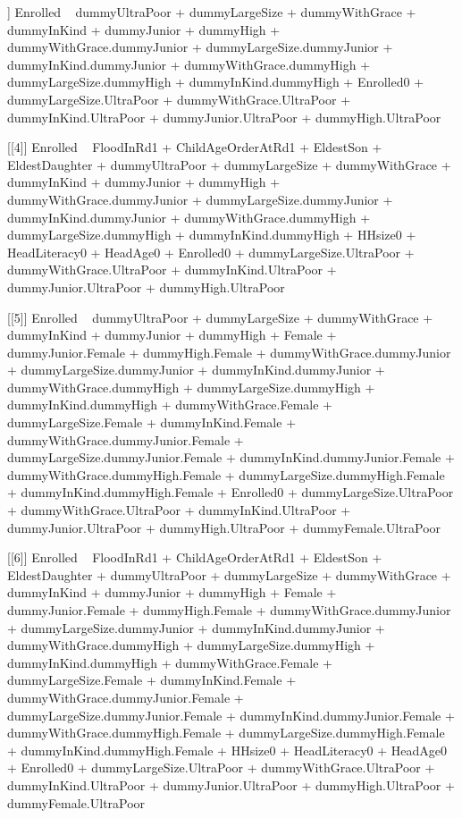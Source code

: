 \begin{Schunk}
\begin{Soutput}
[[3]]
Enrolled ~ dummyUltraPoor + dummyLargeSize + dummyWithGrace + 
    dummyInKind + dummyJunior + dummyHigh + dummyWithGrace.dummyJunior + 
    dummyLargeSize.dummyJunior + dummyInKind.dummyJunior + dummyWithGrace.dummyHigh + 
    dummyLargeSize.dummyHigh + dummyInKind.dummyHigh + Enrolled0 + 
    dummyLargeSize.UltraPoor + dummyWithGrace.UltraPoor + dummyInKind.UltraPoor + 
    dummyJunior.UltraPoor + dummyHigh.UltraPoor

[[4]]
Enrolled ~ FloodInRd1 + ChildAgeOrderAtRd1 + EldestSon + EldestDaughter + 
    dummyUltraPoor + dummyLargeSize + dummyWithGrace + dummyInKind + 
    dummyJunior + dummyHigh + dummyWithGrace.dummyJunior + dummyLargeSize.dummyJunior + 
    dummyInKind.dummyJunior + dummyWithGrace.dummyHigh + dummyLargeSize.dummyHigh + 
    dummyInKind.dummyHigh + HHsize0 + HeadLiteracy0 + HeadAge0 + 
    Enrolled0 + dummyLargeSize.UltraPoor + dummyWithGrace.UltraPoor + 
    dummyInKind.UltraPoor + dummyJunior.UltraPoor + dummyHigh.UltraPoor

[[5]]
Enrolled ~ dummyUltraPoor + dummyLargeSize + dummyWithGrace + 
    dummyInKind + dummyJunior + dummyHigh + Female + dummyJunior.Female + 
    dummyHigh.Female + dummyWithGrace.dummyJunior + dummyLargeSize.dummyJunior + 
    dummyInKind.dummyJunior + dummyWithGrace.dummyHigh + dummyLargeSize.dummyHigh + 
    dummyInKind.dummyHigh + dummyWithGrace.Female + dummyLargeSize.Female + 
    dummyInKind.Female + dummyWithGrace.dummyJunior.Female + 
    dummyLargeSize.dummyJunior.Female + dummyInKind.dummyJunior.Female + 
    dummyWithGrace.dummyHigh.Female + dummyLargeSize.dummyHigh.Female + 
    dummyInKind.dummyHigh.Female + Enrolled0 + dummyLargeSize.UltraPoor + 
    dummyWithGrace.UltraPoor + dummyInKind.UltraPoor + dummyJunior.UltraPoor + 
    dummyHigh.UltraPoor + dummyFemale.UltraPoor

[[6]]
Enrolled ~ FloodInRd1 + ChildAgeOrderAtRd1 + EldestSon + EldestDaughter + 
    dummyUltraPoor + dummyLargeSize + dummyWithGrace + dummyInKind + 
    dummyJunior + dummyHigh + Female + dummyJunior.Female + dummyHigh.Female + 
    dummyWithGrace.dummyJunior + dummyLargeSize.dummyJunior + 
    dummyInKind.dummyJunior + dummyWithGrace.dummyHigh + dummyLargeSize.dummyHigh + 
    dummyInKind.dummyHigh + dummyWithGrace.Female + dummyLargeSize.Female + 
    dummyInKind.Female + dummyWithGrace.dummyJunior.Female + 
    dummyLargeSize.dummyJunior.Female + dummyInKind.dummyJunior.Female + 
    dummyWithGrace.dummyHigh.Female + dummyLargeSize.dummyHigh.Female + 
    dummyInKind.dummyHigh.Female + HHsize0 + HeadLiteracy0 + 
    HeadAge0 + Enrolled0 + dummyLargeSize.UltraPoor + dummyWithGrace.UltraPoor + 
    dummyInKind.UltraPoor + dummyJunior.UltraPoor + dummyHigh.UltraPoor + 
    dummyFemale.UltraPoor


\end{Soutput}
\end{Schunk}
